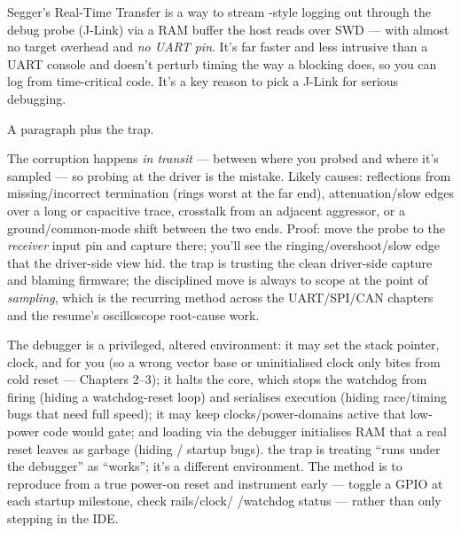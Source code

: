 Segger's Real-Time Transfer is a way to stream -style logging out
through the debug probe (J-Link) via a RAM buffer the host reads over SWD ---
with almost no target overhead and \emph{no UART pin}. It's far faster and less
intrusive than a UART console and doesn't perturb timing the way a blocking
 does, so you can log from time-critical code. It's a key reason to
pick a J-Link for serious debugging.

%
{A paragraph plus the trap.}

The corruption happens \emph{in transit} --- between where you probed and where
it's sampled --- so probing at the driver is the mistake. Likely causes:
reflections from missing/incorrect termination (rings worst at the far end),
attenuation/slow edges over a long or capacitive trace, crosstalk from an
adjacent aggressor, or a ground/common-mode shift between the two ends. Proof:
move the probe to the \emph{receiver} input pin and capture there; you'll see the
ringing/overshoot/slow edge that the driver-side view hid. \trap the trap is
trusting the clean driver-side capture and blaming firmware; the disciplined move
is always to scope at the point of \emph{sampling}, which is the recurring method
across the UART/SPI/CAN chapters and the resume's oscilloscope root-cause work.

The debugger is a privileged, altered environment: it may set the stack pointer,
clock, and  for you (so a wrong vector base or uninitialised clock
only bites from cold reset --- Chapters 2--3); it halts the core, which stops the
watchdog from firing (hiding a watchdog-reset loop) and serialises execution
(hiding race/timing bugs that need full speed); it may keep clocks/power-domains
active that low-power code would gate; and loading via the debugger initialises
RAM that a real reset leaves as garbage (hiding / startup
bugs). \trap the trap is treating ``runs under the debugger'' as ``works''; it's a
different environment. The method is to reproduce from a true power-on reset and
instrument early --- toggle a GPIO at each startup milestone, check rails/clock/
/watchdog status --- rather than only stepping in the IDE.

